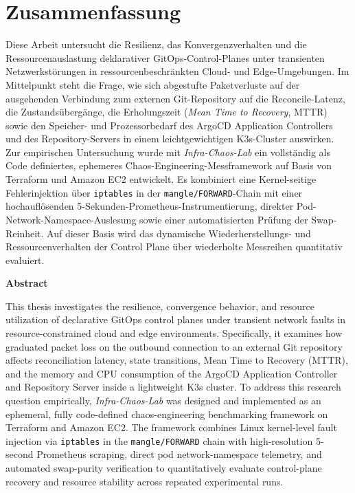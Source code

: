 \chapter*{Zusammenfassung}
\label{sec:zusammenfassung}

Diese Arbeit untersucht die Resilienz, das Konvergenzverhalten und die Ressourcenauslastung deklarativer GitOps-Control-Planes unter transienten Netzwerkstörungen in ressourcenbeschränkten Cloud- und Edge-Umgebungen. Im Mittelpunkt steht die Frage, wie sich abgestufte Paketverluste auf der ausgehenden Verbindung zum externen Git-Repository auf die Reconcile-Latenz, die Zustandsübergänge, die Erholungszeit (\textit{Mean Time to Recovery}, MTTR) sowie den Speicher- und Prozessorbedarf des ArgoCD Application Controllers und des Repository-Servers in einem leichtgewichtigen K3s-Cluster auswirken. Zur empirischen Untersuchung wurde mit \textit{Infra-Chaos-Lab} ein vollständig als Code definiertes, ephemeres Chaos-Engineering-Messframework auf Basis von Terraform und Amazon EC2 entwickelt. Es kombiniert eine Kernel-seitige Fehlerinjektion über \texttt{iptables} in der \texttt{mangle/FORWARD}-Chain mit einer hochauflösenden 5-Sekunden-Prometheus-Instrumentierung, direkter Pod-Network-Namespace-Auslesung sowie einer automatisierten Prüfung der Swap-Reinheit. Auf dieser Basis wird das dynamische Wiederherstellungs- und Ressourcenverhalten der Control Plane über wiederholte Messreihen quantitativ evaluiert.

\vspace{0.5cm}

\begin{center}
\textbf{Abstract}
\end{center}

This thesis investigates the resilience, convergence behavior, and resource utilization of declarative GitOps control planes under transient network faults in resource-constrained cloud and edge environments. Specifically, it examines how graduated packet loss on the outbound connection to an external Git repository affects reconciliation latency, state transitions, Mean Time to Recovery (MTTR), and the memory and CPU consumption of the ArgoCD Application Controller and Repository Server inside a lightweight K3s cluster. To address this research question empirically, \textit{Infra-Chaos-Lab} was designed and implemented as an ephemeral, fully code-defined chaos-engineering benchmarking framework on Terraform and Amazon EC2. The framework combines Linux kernel-level fault injection via \texttt{iptables} in the \texttt{mangle/FORWARD} chain with high-resolution 5-second Prometheus scraping, direct pod network-namespace telemetry, and automated swap-purity verification to quantitatively evaluate control-plane recovery and resource stability across repeated experimental runs.
